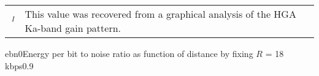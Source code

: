 \vspace{2mm}

{
\small
\renewcommand{\arraystretch}{1.1}
\begin{tabularx}{\linewidth}{lX}
    $\,^{I}$ & This value was recovered from a graphical analysis of the HGA Ka-band gain pattern. \cite{juno_telecommunication}
\end{tabularx}

{ebn0}{Energy per bit to noise ratio as function of distance by fixing $R$ = 18 kbps}{0.9}
}


    
